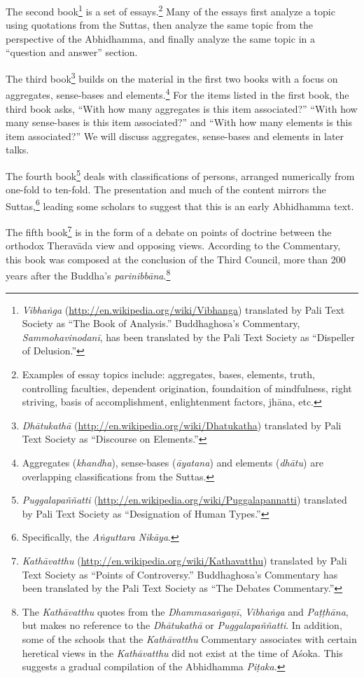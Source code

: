 The second book\footnote{\textit{Vibhaṅga} (\url{http://en.wikipedia.org/wiki/Vibhanga}) translated by Pali Text Society as “The Book of Analysis.” Buddhaghosa’s Commentary, \textit{Sammohavinodanī}, has been translated by the Pali Text Society as “Dispeller of Delusion.”} is a set of essays.\footnote{Examples of essay topics include: aggregates, bases, elements, truth, controlling faculties, dependent origination, foundaition of mindfulness, right striving, basis of accomplishment, enlightenment factors, jhāna, etc.} Many of the essays first analyze a topic using quotations from the Suttas, then analyze the same topic from the perspective of the Abhidhamma, and finally analyze the same topic in a “question and answer” section.

\pagebreak

The third book\footnote{\textit{Dhātukathā} (\url{http://en.wikipedia.org/wiki/Dhatukatha}) translated by Pali Text Society as “Discourse on Elements.”} builds on the material in the first two books with a focus on aggregates, sense-bases and elements.\footnote{Aggregates (\textit{khandha}), sense-bases (\textit{āyatana}) and elements (\textit{dhātu}) are overlapping classifications from the Suttas.} For the items listed in the first book, the third book asks, “With how many aggregates is this item associated?” “With how many sense-bases is this item associated?” and “With how many elements is this item associated?” We will discuss aggregates, sense-bases and elements in later talks.

The fourth book\footnote{\textit{Puggalapaññatti} (\url{http://en.wikipedia.org/wiki/Puggalapannatti}) translated by Pali Text Society as “Designation of Human Types.”} deals with classifications of persons, arranged numerically from one-fold to ten-fold. The presentation and much of the content mirrors the Suttas,\footnote{Specifically, the \textit{Aṅguttara Nikāya}.} leading some scholars to suggest that this is an early Abhidhamma text.

The fifth book\footnote{\textit{Kathāvatthu} (\url{http://en.wikipedia.org/wiki/Kathavatthu}) translated by Pali Text Society as “Points of Controversy.” Buddhaghosa’s Commentary has been translated by the Pali Text Society as “The Debates Commentary.”} is in the form of a debate on points of doctrine between the orthodox Theravāda view and opposing views. According to the Commentary, this book was composed at the conclusion of the Third Council, more than 200 years after the Buddha’s \textit{parinibbāna}.\footnote{The \textit{Kathāvatthu} quotes from the \textit{Dhammasaṅgaṇī}, \textit{Vibhaṅga} and \textit{Paṭṭhāna}, but makes no reference to the \textit{Dhātukathā} or \textit{Puggalapaññatti}. In addition, some of the schools that the \textit{Kathāvatthu} Commentary associates with certain heretical views in the \textit{Kathāvatthu} did not exist at the time of Aśoka. This suggests a gradual compilation of the Abhidhamma \textit{Piṭaka}.}

